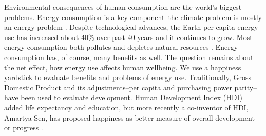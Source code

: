 \documentclass[10pt, letterpaper]{article}
\begin{document}
\begin{spacing}{1.4}




Environmental consequences of human consumption are the world's biggest
problems.  Energy consumption is a key component--the climate problem is mostly an energy problem \cite{mackay08}. Despite
technological advances, the Earth per capita energy use has increased about 40\%
over past 40 years and it continues to grow. %
Most energy consumption both pollutes and  depletes natural resources
\cite{arrow04, soytas07}. %
 Energy consumption has, of course, many benefits as well.
 The question remains about the net effect, how energy use affects human wellbeing.
We use a happiness yardstick
to evaluate benefits and problems of energy use. Traditionally, Gross Domestic
Product and its adjustments--per capita and purchasing power parity--have been used to evaluate development. Human Development Index (HDI)
added life expectancy and education, but more recently a co-inventor of HDI,
Amartya Sen, has proposed happiness as better measure of overall development or
progress 
\cite{stiglitz09al}. 


\end{spacing}
\end{document}
